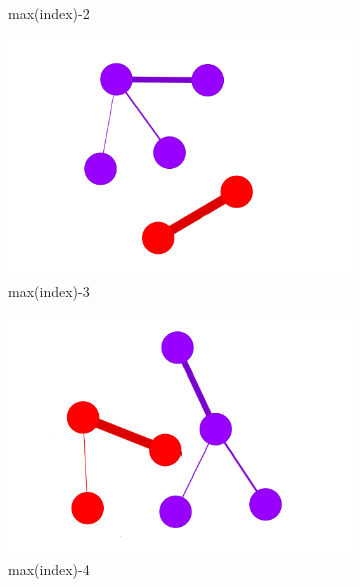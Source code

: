 \begin{figure}[!htb]
\begin{subfigure}[b]{0.13\linewidth}
		\caption{max(index)-2}
	\end{subfigure}
	\hfill
	\begin{subfigure}[b]{0.13\linewidth}
		\includegraphics[width=\linewidth]{Minor Thesis/figures/graphs/sa/D.png}
		\caption{max(index)-3}
	\end{subfigure}
	\hfill
	\begin{subfigure}[b]{0.13\linewidth}
		\includegraphics[width=\linewidth]{Minor Thesis/figures/graphs/sa/E.png}
		\caption{max(index)-4}
	\end{subfigure}
	\hfill
	\begin{subfigure}[b]{0.13\linewidth}

\end{subfigure}
\end{figure}

